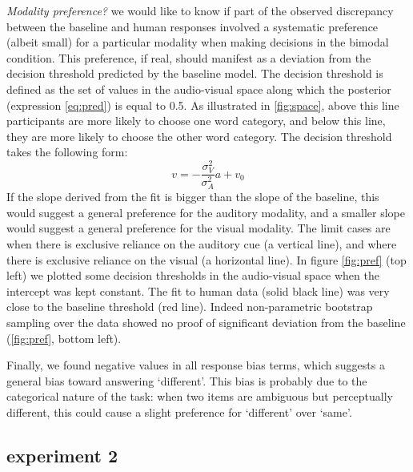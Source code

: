 \documentclass[10pt,letterpaper]{article}
\begin{document}
\textit{Modality preference?} we would like to know if part of the observed discrepancy between the baseline and human responses involved a systematic preference (albeit small) for a particular modality when making decisions in the bimodal condition. This preference, if real, should manifest as a deviation from the decision threshold predicted by the baseline model. The decision threshold is defined as the set of values in the audio-visual space along which the posterior (expression \ref{eq:pred}) is equal to 0.5. As illustrated in \ref{fig:space}, above this line participants are more likely to choose one word category, and below this line, they are more likely to choose the other word category. 
The decision threshold takes the following form:
\begin{equation}
v=-\frac{\sigma^2_V}{\sigma^2_A}a+v_0
\label{eq:threshold}
\end{equation}
If the slope derived from the fit is bigger than the slope of the baseline, this would suggest a general preference for the auditory modality, and a smaller slope would suggest a general preference for the visual modality. The limit cases are when there is exclusive reliance on the auditory cue (a vertical line), and where there is exclusive reliance on the visual (a horizontal line). In figure \ref{fig:pref} (top left) we plotted some decision thresholds in the audio-visual space when the intercept was kept constant. The fit to human data  (solid black line) was very close to the baseline threshold (red line). Indeed non-parametric bootstrap sampling over the data showed no proof of significant deviation from the baseline (\ref{fig:pref}, bottom left).

Finally, we found negative values in all response bias terms, which suggests a general bias toward answering `different'.  This bias is probably due to the categorical nature of the task: when two items are ambiguous but perceptually different, this could cause a slight preference for `different' over `same'. 



\subsection{experiment 2}
\end{document}
